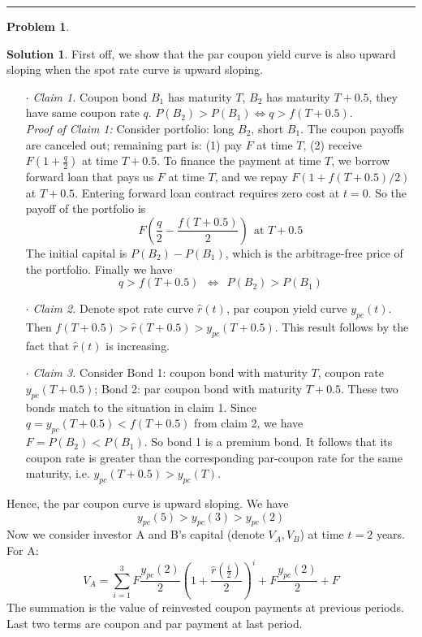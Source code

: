 \documentclass[a4paper, 10pt]{article}
\theoremstyle{definition}
\newtheorem{problem}{Problem}
\theoremstyle{hSol}
\newtheorem*{solution}{Solution}
\begin{document}
\noindent\rule{16cm}{0.4pt}
\begin{problem}
\end{problem}
\begin{solution} First off, we show that the par coupon yield curve is also upward sloping when the spot rate curve is upward sloping.
\begin{itemize}
  \item[$\cdot$] \textit{Claim 1.} Coupon bond $B_1$ has maturity $T$, $B_2$ has maturity $T+0.5$, they have same coupon rate $q$. $P(B_2)>P(B_1)\iff q>f(T+0.5)$. \\
  \textit{Proof of Claim 1:} Consider portfolio: long $B_2$, short $B_1$. The coupon payoffs are canceled out; remaining part is: (1) pay $F$ at time $T$, (2) receive $F(1+\tfrac{q}{2})$ at time $T+0.5$. To finance the payment at time $T$, we borrow forward loan that pays us $F$ at time $T$, and we repay $F(1+f(T+0.5)/2)$ at $T+0.5$. Entering forward loan contract requires zero cost at $t=0$. So the payoff of the portfolio is
  $$
  F\left(\frac{q}{2} - \frac{f(T+0.5)}{2}\right)~~\text{at~}T+0.5
  $$
  The initial capital is $P(B_2)-P(B_1)$, which is the arbitrage-free price of the portfolio. Finally we have
  $$
  q > f(T+0.5)~~\iff~~P(B_2) > P(B_1)
  $$
  \item[$\cdot$] \textit{Claim 2.} Denote spot rate curve $\hat{r}(t)$, par coupon yield curve $y_{pc}(t)$. Then $f(T+0.5)>\hat{r}(T+0.5)>y_{pc}(T+0.5)$. This result follows by the fact that $\hat{r}(t)$ is increasing.
  \item[$\cdot$] \textit{Claim 3.} Consider Bond 1: coupon bond with maturity $T$, coupon rate $y_{pc}(T+0.5)$; Bond 2: par coupon bond with maturity $T+0.5$. These two bonds match to the situation in claim 1. Since $q=y_{pc}(T+0.5)<f(T+0.5)$ from claim 2, we have $F=P(B_2)<P(B_1)$. So bond 1 is a premium bond. It follows that its coupon rate is greater than the corresponding par-coupon rate for the same maturity, i.e. $y_{pc}(T+0.5)>y_{pc}(T)$. 
\end{itemize}
Hence, the par coupon curve is upward sloping. We have
$$
y_{pc}(5) > y_{pc}(3) > y_{pc}(2)
$$
Now we consider investor A and B's capital (denote $V_A, V_B$) at time $t=2$ years. For A:
\begin{equation}
  V_A = \sum_{i=1}^{3} F\frac{y_{pc}(2)}{2}\left(1+\frac{\hat{r}(\frac{i}{2})}{2}\right)^{i} + F\frac{y_{pc}(2)}{2} + F
\end{equation}
The summation is the value of reinvested coupon payments at previous periods. Last two terms are coupon and par payment at last period. \\

\end{solution}
\end{document}

